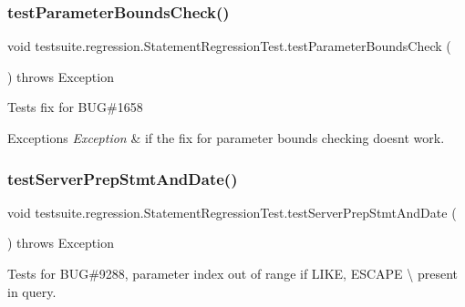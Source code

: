 \subsubsection{\texorpdfstring{test\+Parameter\+Bounds\+Check()}{testParameterBoundsCheck()}}
{\footnotesize\ttfamily void testsuite.\+regression.\+Statement\+Regression\+Test.\+test\+Parameter\+Bounds\+Check (\begin{DoxyParamCaption}{ }\end{DoxyParamCaption}) throws Exception}

Tests fix for B\+UG\#1658


\begin{DoxyExceptions}{Exceptions}
{\em Exception} & if the fix for parameter bounds checking doesn\textquotesingle{}t work. \\
\hline
\end{DoxyExceptions}
\mbox{\label{classtestsuite_1_1regression_1_1_statement_regression_test_a95273398ebb6f8ab8e39d8ab7d7d7ec2}} 
\subsubsection{\texorpdfstring{test\+Server\+Prep\+Stmt\+And\+Date()}{testServerPrepStmtAndDate()}}
{\footnotesize\ttfamily void testsuite.\+regression.\+Statement\+Regression\+Test.\+test\+Server\+Prep\+Stmt\+And\+Date (\begin{DoxyParamCaption}{ }\end{DoxyParamCaption}) throws Exception}

Tests for B\+UG\#9288, parameter index out of range if L\+I\+KE, E\+S\+C\+A\+PE \textquotesingle{}\textbackslash{}\textquotesingle{} present in query.


